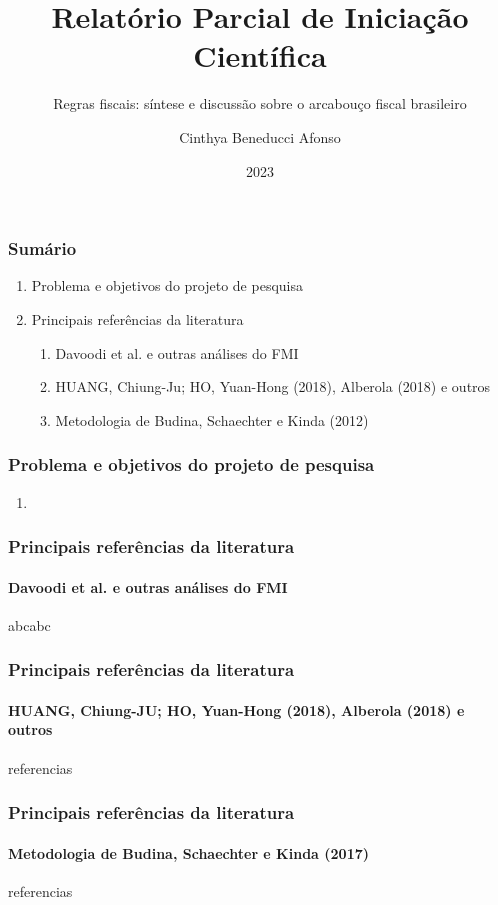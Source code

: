 \documentclass{beamer}
\title{Relatório Parcial de Iniciação Científica}
\subtitle{Regras fiscais: síntese e discussão sobre o arcabouço fiscal brasileiro}
\author{Cinthya Beneducci Afonso}
\institute{FEA-USP}
\date{2023}
\begin{document}
\frame{\titlepage}

\begin{frame}
\frametitle{Sumário}
\begin{enumerate}
    \item Problema e objetivos do projeto de pesquisa
    \item Principais referências da literatura
    \begin{enumerate}
        \item Davoodi et al. e outras análises do FMI
        \item HUANG, Chiung-Ju; HO, Yuan-Hong (2018), Alberola (2018) e outros
        \item Metodologia de Budina, Schaechter e Kinda (2012)
    \end{enumerate}
        
\end{enumerate}
\end{frame}


\begin{frame}
\frametitle{Problema e objetivos do projeto de pesquisa}
\begin{enumerate}
    \item 
\end{enumerate}
\end{frame}

\begin{frame}
\frametitle{Principais referências da literatura}
\framesubtitle{Davoodi et al. e outras análises do FMI}

abcabc
\end{frame}

\begin{frame}
\frametitle{Principais referências da literatura}
\framesubtitle{HUANG, Chiung-JU; HO, Yuan-Hong (2018), Alberola (2018) e outros}

referencias
    
\end{frame}

\begin{frame}
\frametitle{Principais referências da literatura}
\framesubtitle{Metodologia de Budina, Schaechter e Kinda (2017)}

referencias
    
\end{frame}
\end{document}
